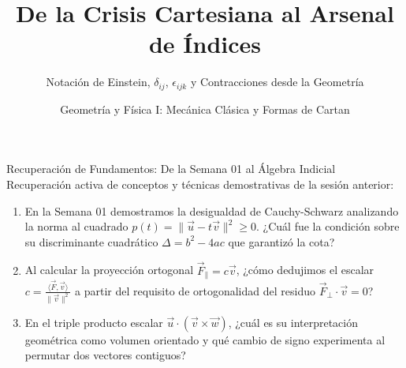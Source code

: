 \documentclass[10pt,aspectratio=169]{beamer}
\title[Semana 2: Arsenal Indicial]{De la Crisis Cartesiana al Arsenal de Índices}
\subtitle{Notación de Einstein, $\delta_{ij}$, $\epsilon_{ijk}$ y Contracciones desde la Geometría}
\author{Geometría y Física I: Mecánica Clásica y Formas de Cartan}
\institute{}
\date{}
\begin{document}
\setlength{\abovedisplayskip}{3pt}
\setlength{\belowdisplayskip}{3pt}

\begin{frame}
  \titlepage
\end{frame}

\begin{frame}{Recuperación de Fundamentos: De la Semana 01 al Álgebra Indicial}
  \vspace{0.1cm}
  Recuperación activa de conceptos y técnicas demostrativas de la sesión anterior:
  \vspace{0.3cm}
  \begin{enumerate}\itemsep14pt
    \item En la Semana 01 demostramos la desigualdad de Cauchy-Schwarz analizando la norma al cuadrado $p(t) = \|\vec{u} - t\vec{v}\|^2 \ge 0$. ¿Cuál fue la condición sobre su discriminante cuadrático $\Delta = b^2 - 4ac$ que garantizó la cota?
    \item Al calcular la proyección ortogonal $\vec{F}_\parallel = c\vec{v}$, ¿cómo dedujimos el escalar $c = \frac{\langle\vec{F},\vec{v}\rangle}{\|\vec{v}\|^2}$ a partir del requisito de ortogonalidad del residuo $\vec{F}_\perp \cdot \vec{v} = 0$?
    \item En el triple producto escalar $\vec{u} \cdot (\vec{v} \times \vec{w})$, ¿cuál es su interpretación geométrica como volumen orientado y qué cambio de signo experimenta al permutar dos vectores contiguos?
  \end{enumerate}
\end{frame}
\end{document}
